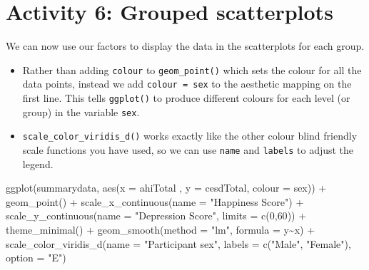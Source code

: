 \documentclass[
  oneside]{book}
\newenvironment{Shaded}{\begin{snugshade}}{\end{snugshade}}
\newcommand{\AttributeTok}[1]{\textcolor[rgb]{0.77,0.63,0.00}{#1}}
\newcommand{\DecValTok}[1]{\textcolor[rgb]{0.00,0.00,0.81}{#1}}
\newcommand{\FunctionTok}[1]{\textcolor[rgb]{0.00,0.00,0.00}{#1}}
\newcommand{\NormalTok}[1]{#1}
\newcommand{\SpecialCharTok}[1]{\textcolor[rgb]{0.00,0.00,0.00}{#1}}
\newcommand{\StringTok}[1]{\textcolor[rgb]{0.31,0.60,0.02}{#1}}
\providecommand{\tightlist}{%
  \setlength{\itemsep}{0pt}\setlength{\parskip}{0pt}}
\begin{document}
\hypertarget{activity-6-grouped-scatterplots}{%
\section{Activity 6: Grouped scatterplots}\label{activity-6-grouped-scatterplots}}

We can now use our factors to display the data in the scatterplots for each group.

\begin{itemize}
\tightlist
\item
  Rather than adding \texttt{colour} to \texttt{geom\_point()} which sets the colour for all the data points, instead we add \texttt{colour\ =\ sex} to the aesthetic mapping on the first line. This tells \texttt{ggplot()} to produce different colours for each level (or group) in the variable \texttt{sex}.
\item
  \texttt{scale\_color\_viridis\_d()} works exactly like the other colour blind friendly scale functions you have used, so we can use \texttt{name} and \texttt{labels} to adjust the legend.
\end{itemize}

\begin{Shaded}
\begin{Highlighting}[]
\FunctionTok{ggplot}\NormalTok{(summarydata, }\FunctionTok{aes}\NormalTok{(}\AttributeTok{x =}\NormalTok{ ahiTotal , }\AttributeTok{y =}\NormalTok{ cesdTotal, }\AttributeTok{colour =}\NormalTok{ sex)) }\SpecialCharTok{+} 
  \FunctionTok{geom\_point}\NormalTok{() }\SpecialCharTok{+}
  \FunctionTok{scale\_x\_continuous}\NormalTok{(}\AttributeTok{name =} \StringTok{"Happiness Score"}\NormalTok{) }\SpecialCharTok{+}
  \FunctionTok{scale\_y\_continuous}\NormalTok{(}\AttributeTok{name =} \StringTok{"Depression Score"}\NormalTok{,}
                     \AttributeTok{limits =} \FunctionTok{c}\NormalTok{(}\DecValTok{0}\NormalTok{,}\DecValTok{60}\NormalTok{)) }\SpecialCharTok{+}
  \FunctionTok{theme\_minimal}\NormalTok{() }\SpecialCharTok{+}
  \FunctionTok{geom\_smooth}\NormalTok{(}\AttributeTok{method =} \StringTok{"lm"}\NormalTok{, }\AttributeTok{formula =}\NormalTok{ y}\SpecialCharTok{\textasciitilde{}}\NormalTok{x) }\SpecialCharTok{+}
  \FunctionTok{scale\_color\_viridis\_d}\NormalTok{(}\AttributeTok{name =} \StringTok{"Participant sex"}\NormalTok{, }
                       \AttributeTok{labels =} \FunctionTok{c}\NormalTok{(}\StringTok{"Male"}\NormalTok{, }\StringTok{"Female"}\NormalTok{),}
                       \AttributeTok{option =} \StringTok{"E"}\NormalTok{)}
\end{Highlighting}
\end{Shaded}
\end{document}
